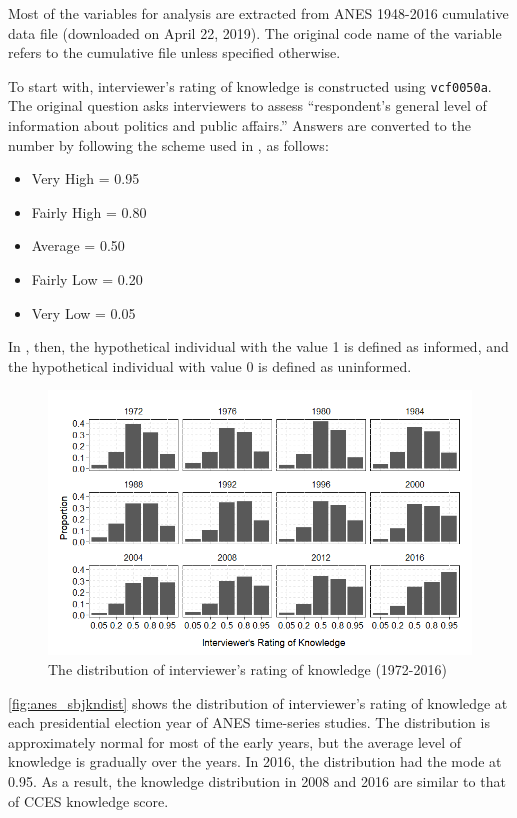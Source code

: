 \par Most of the variables for analysis are extracted from ANES 1948-2016 cumulative data file (downloaded on April 22, 2019). The original code name of the variable refers to the cumulative file unless specified otherwise. 

\par To start with, interviewer's rating of knowledge is constructed using \texttt{vcf0050a}. The original question asks interviewers to assess ``respondent's general level of information about politics and public affairs.'' Answers are converted to the number by following the scheme used in \cite{Bartels1996unvo}, as follows:
\begin{itemize}
    \item Very High = 0.95
    \item Fairly High = 0.80
    \item Average = 0.50
    \item Fairly Low = 0.20
    \item Very Low = 0.05
\end{itemize}    
\noindent In \cite{Bartels1996unvo}, then, the hypothetical individual with the value 1 is defined as informed, and the hypothetical individual with value 0 is defined as uninformed.

\begin{figure}[ht!!!]
    \caption{The distribution of interviewer's rating of knowledge (1972-2016)}
    \label{fig:anes_sbjkndist}
    \includegraphics[width=\linewidth]{../outputs/anes_sbjkndist.png}
\end{figure}

\par \autoref{fig:anes_sbjkndist} shows the distribution of interviewer's rating of knowledge at each presidential election year of ANES time-series studies. The distribution is approximately normal for most of the early years, but the average level of knowledge is gradually over the years. In 2016, the distribution had the mode at 0.95. As a result, the knowledge distribution in 2008 and 2016 are similar to that of CCES knowledge score.    

